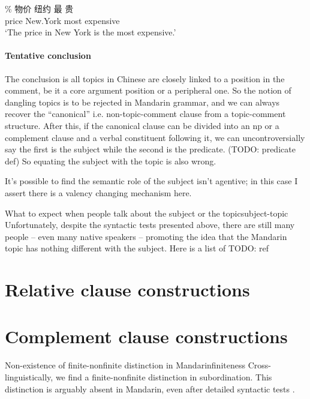 \documentclass[UTF8, a4paper, oneside, scheme=plain]{ctexrep}
\newcommand{\translate}[1]{`#1'}
\begin{document}
\begin{exe}
    \ex \gll \% 物价 纽约 最 贵  \\
    {} price New.York most expensive \\
    \glt \translate{The price in New York is the most expensive.}
\end{exe}

\subsubsection{Tentative conclusion}

The conclusion is all topics in Chinese are closely linked to a position in the comment,
be it a core argument position or a peripheral one.
So the notion of dangling topics is to be rejected in Mandarin grammar,
and we can always recover the ``canonical'' i.e. non-topic-comment clause
from a topic-comment structure.
After this, if the canonical clause can be divided into an \acs{np}
or a complement clause and a verbal constituent following it,
we can uncontroversially say the first is the subject while the second is the predicate. (TODO: predicate def)
So equating the subject with the topic is also wrong.

It's possible to find the semantic role of the subject isn't agentive;
in this case I assert there is a valency changing mechanism here.

\begin{infobox}{What to expect when people talk about the subject or the topic}{subject-topic}
    Unfortunately, despite the syntactic tests presented above,
    there are still many people -- even many native speakers -- 
    promoting the idea that the Mandarin topic has nothing different with the subject.
    Here is a list of TODO: ref
\end{infobox}

\chapter{Relative clause constructions}





\chapter{Complement clause constructions}\label{sec:complement-clause}


\begin{infobox}{Non-existence of finite-nonfinite distinction in Mandarin}{finiteness}
    Cross-linguistically, we find a finite-nonfinite distinction in subordination.
    This distinction is arguably absent in Mandarin,
    even after detailed syntactic tests \citep{no-finite}.
\end{infobox}
\end{document}
